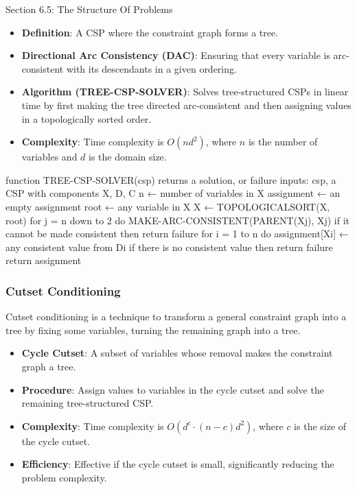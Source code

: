 \begin{notes}{Section 6.5: The Structure Of Problems}
\begin{highlight}
        \begin{itemize}
            \item \textbf{Definition}: A CSP where the constraint graph forms a tree.
            \item \textbf{Directional Arc Consistency (DAC)}: Ensuring that every variable is arc-consistent with its descendants in a given ordering.
            \item \textbf{Algorithm (TREE-CSP-SOLVER)}: Solves tree-structured CSPs in linear time by first making the tree directed arc-consistent and then assigning values in a topologically sorted order.
            \item \textbf{Complexity}: Time complexity is $O(nd^2)$, where $n$ is the number of variables and $d$ is the domain size.
        \end{itemize}
    
    \begin{code}[Pseudo]
    function TREE-CSP-SOLVER(csp) returns a solution, or failure
        inputs: csp, a CSP with components X, D, C
        n ← number of variables in X
        assignment ← an empty assignment
        root ← any variable in X
        X ← TOPOLOGICALSORT(X, root)
        for j = n down to 2 do
            MAKE-ARC-CONSISTENT(PARENT(Xj), Xj)
            if it cannot be made consistent then return failure
        for i = 1 to n do
            assignment[Xi] ← any consistent value from Di
            if there is no consistent value then return failure
        return assignment
    \end{code}

    \end{highlight}
    
    
    \subsubsection*{Cutset Conditioning}
    
    Cutset conditioning is a technique to transform a general constraint graph into a tree by fixing some variables, turning the remaining graph into a tree.
    
    \begin{highlight}
    
        \begin{itemize}
            \item \textbf{Cycle Cutset}: A subset of variables whose removal makes the constraint graph a tree.
            \item \textbf{Procedure}: Assign values to variables in the cycle cutset and solve the remaining tree-structured CSP.
            \item \textbf{Complexity}: Time complexity is $O(d^c \cdot (n-c)d^2)$, where $c$ is the size of the cycle cutset.
            \item \textbf{Efficiency}: Effective if the cycle cutset is small, significantly reducing the problem complexity.
        \end{itemize}
    

\end{highlight}
\end{notes}
